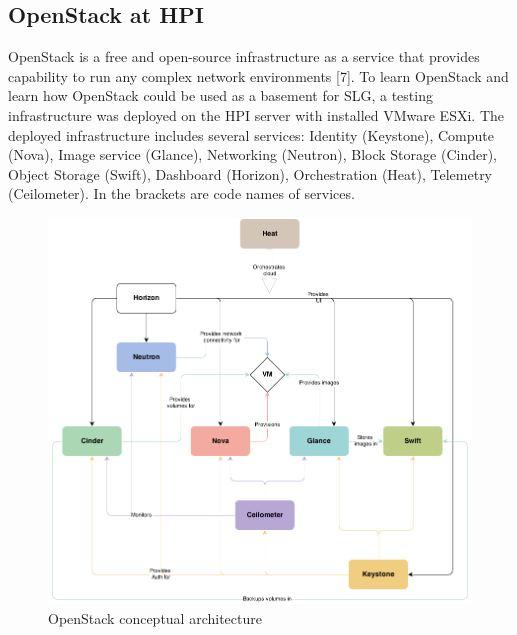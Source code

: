   


 




\subsection{OpenStack at HPI}
OpenStack is a free and open-source infrastructure as a service that provides capability to run any complex network environments [7]. To learn OpenStack and learn how OpenStack could be used as a basement for SLG, a testing infrastructure was deployed on the HPI server with installed VMware ESXi. The deployed infrastructure includes several services: Identity (Keystone), Compute (Nova), Image service (Glance), Networking (Neutron), Block Storage (Cinder), Object Storage (Swift), Dashboard (Horizon), Orchestration (Heat), Telemetry (Ceilometer). In the brackets are code names of services. 
\begin{figure}[ht!]
\centering
\includegraphics[width=\textwidth]{openstack_conceptual_architecture.png}
\caption{OpenStack conceptual architecture}
\label{overflow}
\end{figure}
